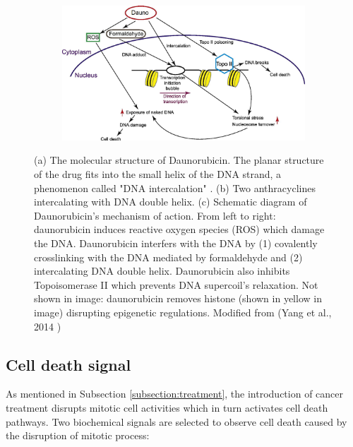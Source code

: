 \documentclass[pdftex,12pt,a4paper]{report}
\begin{document}
\begin{figure}[H]
\begin{subfigure}{.35\textwidth}
  \caption{}
  \label{fig:anthracyclines_dna}
\end{subfigure}
\centering
\begin{subfigure}{0.9\textwidth}
  \centering
  \includegraphics[width=\textwidth]{images/daunorubicin_mechanism}
  \caption{}
  \label{fig:dauno_mechanism}
\end{subfigure}
\caption[The structure and mechanism of Daunorubicin]{(a) The molecular structure of Daunorubicin. The planar structure of the drug fits into the small helix of the DNA strand, a phenomenon called "DNA intercalation" \cite{leng1996base}. (b) Two anthracyclines intercalating with DNA double helix. (c) Schematic diagram of Daunorubicin's mechanism of action. From left to right: daunorubicin induces reactive oxygen species (ROS) which damage the DNA. Daunorubicin interfers with the DNA by (1) covalently crosslinking with the DNA mediated by formaldehyde and (2) intercalating DNA double helix. Daunorubicin also inhibits Topoisomerase II which prevents DNA supercoil's relaxation. Not shown in image: daunorubicin removes histone (shown in yellow in image) disrupting epigenetic regulations. Modified from (Yang et al., 2014 \cite{yang2014doxorubicin})}
\end{figure}

\subsection{Cell death signal}
\label{subsection:cell_death_signal}

As mentioned in Subsection \ref{subsection:treatment}, the introduction of cancer treatment disrupts mitotic cell activities which in turn activates cell death pathways. Two biochemical signals are selected to observe cell death caused by the disruption of mitotic process: %
\end{document}
